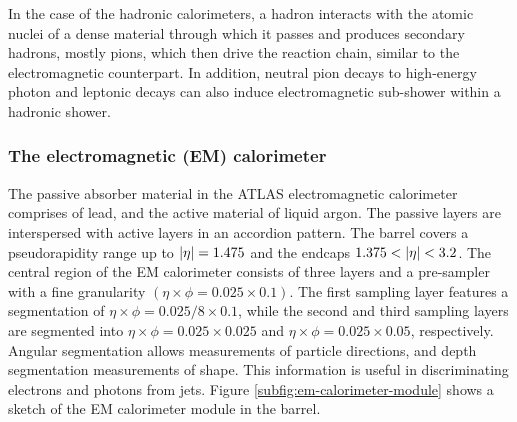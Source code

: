 In the case of the hadronic calorimeters, a hadron interacts with the atomic nuclei of a dense material through which it passes and produces secondary hadrons, mostly pions, which then drive the reaction chain, similar to the electromagnetic counterpart. 
In addition, neutral pion decays to high-energy photon and leptonic decays can also induce electromagnetic sub-shower within a hadronic shower. 

\subsubsection{The electromagnetic (EM) calorimeter}
The passive absorber material in the ATLAS electromagnetic calorimeter comprises of lead, and the active material of liquid argon. 
The passive layers are interspersed with active layers in an accordion pattern. 
The barrel covers a pseudorapidity range up to $\abs{\eta} = 1.475$ and the endcaps $1.375 < \abs{\eta}<3.2$. 
The central region of the EM calorimeter consists of three layers and a pre-sampler with a fine granularity $(\eta\times\phi=0.025\times 0.1)$. 
The first sampling layer features a segmentation of $\eta\times\phi=0.025/8\times 0.1$, while the second and third sampling layers are segmented into $\eta\times\phi=0.025\times 0.025$ and $\eta\times\phi=0.025\times 0.05$, respectively. 
Angular segmentation allows measurements of particle directions, and depth segmentation measurements of shape. 
This information is useful in discriminating electrons and photons from jets. 
Figure \ref{subfig:em-calorimeter-module} shows a sketch of the EM calorimeter module in the barrel. 

